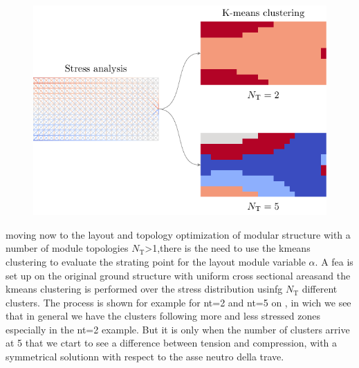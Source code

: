 \begin{figure}
    \centering
    \includegraphics{figures/06_DMO/00_optimized_modules/kmeans.pdf}
    \caption{}
    \label{fig:06_cant_kmeans}
\end{figure}

moving now to the layout and topology optimization of modular structure with a number of module topologies $N_\text{T}$>1,there is the need to use the kmeans clustering to evaluate the strating point for the layout module variable $\alpha$. A \gls{fea} is set up on the original ground structure with uniform cross sectional areasand the kmeans clustering is performed over the stress distribution usinfg $N_\text{T}$ different clusters. The process is shown for example for nt=2 and nt=5 on , in wich we see that in general we have the clusters following more and less stressed zones especially in the nt=2 example. But it is only when the number of clusters arrive at 5 that we ctart to see a difference between tension and compression, with a symmetrical solutionn with respect to the asse neutro della trave.


